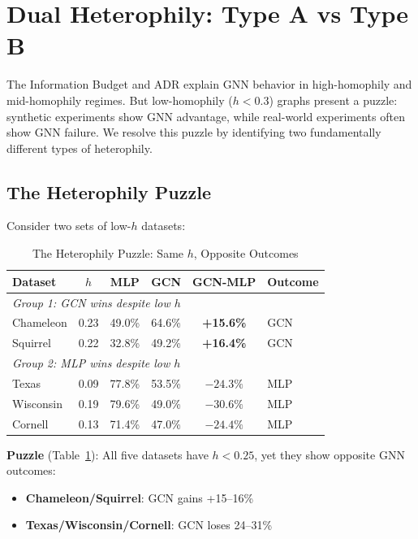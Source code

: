 
\section{Dual Heterophily: Type A vs Type B}
\label{sec:heterophily}

The Information Budget and ADR explain GNN behavior in high-homophily and mid-homophily regimes. But low-homophily ($h < 0.3$) graphs present a puzzle: synthetic experiments show GNN advantage, while real-world experiments often show GNN failure. We resolve this puzzle by identifying two fundamentally different types of heterophily.

\subsection{The Heterophily Puzzle}

Consider two sets of low-$h$ datasets:

\begin{table}[t]
\centering
\caption{The Heterophily Puzzle: Same $h$, Opposite Outcomes}
\label{tab:heterophily_puzzle}
\begin{tabular}{@{}lccccl@{}}
\toprule
\textbf{Dataset} & \textbf{$h$} & \textbf{MLP} & \textbf{GCN} & \textbf{GCN-MLP} & \textbf{Outcome} \\
\midrule
\multicolumn{6}{l}{\textit{Group 1: GCN wins despite low $h$}} \\
Chameleon & 0.23 & 49.0\% & 64.6\% & \textbf{+15.6\%} & GCN \\
Squirrel & 0.22 & 32.8\% & 49.2\% & \textbf{+16.4\%} & GCN \\
\midrule
\multicolumn{6}{l}{\textit{Group 2: MLP wins despite low $h$}} \\
Texas & 0.09 & 77.8\% & 53.5\% & $-24.3\%$ & MLP \\
Wisconsin & 0.19 & 79.6\% & 49.0\% & $-30.6\%$ & MLP \\
Cornell & 0.13 & 71.4\% & 47.0\% & $-24.4\%$ & MLP \\
\bottomrule
\end{tabular}
\end{table}

\textbf{Puzzle} (Table~\ref{tab:heterophily_puzzle}): All five datasets have $h < 0.25$, yet they show opposite GNN outcomes:
\begin{itemize}
    \item \textbf{Chameleon/Squirrel}: GCN gains +15--16\%
    \item \textbf{Texas/Wisconsin/Cornell}: GCN loses 24--31\%
\end{itemize}

